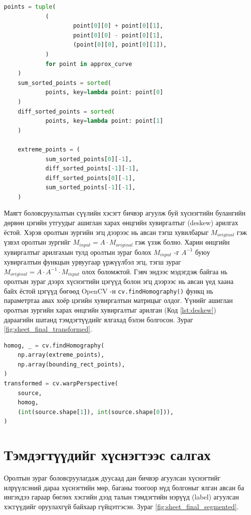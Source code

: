 \begin{lstlisting}[caption={Тоймлосон цэгүүдээс хүснэгтийн булангийн цэгүүдийг олох}, label=extremePoints, language=Python]
	points = tuple(
			(
					point[0][0] + point[0][1],
					point[0][0] - point[0][1],
					(point[0][0], point[0][1]),
			)
			for point in approx_curve
	)
	sum_sorted_points = sorted(
			points, key=lambda point: point[0]
	)
	diff_sorted_points = sorted(
			points, key=lambda point: point[1]
	)
	
	extreme_points = (
			sum_sorted_points[0][-1],
			diff_sorted_points[-1][-1],
			diff_sorted_points[0][-1],
			sum_sorted_points[-1][-1],
	)
	\end{lstlisting}

Маягт боловсруулалтын сүүлийн хэсэгт бичвэр агуулж буй хүснэгтийн булангийн дөрвөн цэгийн утгуудыг ашиглан харах өнцгийн хувиргалтыг (deskew) арилгах ёстой. Хэрэв оролтын зургийн эгц дээрээс нь авсан тэгш хувилбарыг $M_{original}$ гэж үзвэл оролтын зургийг $M_{input} = A \cdot M_{original}$ гэж үзэж болно. Харин өнцгийн хувиргалтыг арилгахын тулд оролтын зураг болох $M_{input}$ -г $A^{-1}$ буюу хувиргалтын функцын урвуугаар үржүүлбэл эгц, тэгш зураг $M_{original} = A \cdot A^{-1} \cdot M_{input}$ олох боломжтой. Гэвч эндээс мэдэгдэж байгаа нь оролтын зураг дээрх хүснэгтийн цэгүүд болон эгц дээрээс нь авсан үед хаана байх ёстой цэгүүд бөгөөд OpenCV -н \texttt{cv.findHomography()} функц нь параметртаа авах хоёр цэгийн хувиргалтын матрицыг олдог. Үүнийг ашиглан оролтын зургийн харах өнцгийн хувиргалтыг арилган (Код \ref{lst:deskew}) дараагийн шатанд тэмдэгтүүдийг ялгахад бэлэн болгосон. Зураг \ref{fig:sheet_final_transformed}.

\begin{lstlisting}[caption={Харах өнцгийн хувиргалтыг арилгах}, label={lst:deskew}, language=Python]
homog, _ = cv.findHomography(
	np.array(extreme_points),
	np.array(bounding_rect_points),
)
transformed = cv.warpPerspective(
	source,
	homog,
	(int(source.shape[1]), int(source.shape[0])),
)
\end{lstlisting}

\section{Тэмдэгтүүдийг хүснэгтээс салгах}

Оролтын зураг боловсруулагдаж дуусаад дан бичвэр агуулсан хүснэгтийг илрүүлсэний дараа хүснэгтийн мөр, баганы тоогоор нүд болгоныг ялган авсан ба ингэхдээ гараар бөглөх хэсгийн дээд талын тэмдэгтийн нэрүүд (label) агуулсан хэсгүүдийг оруулахгүй байхаар гүйцэтгэсэн. Зураг \ref{fig:sheet_final_segmented}.

